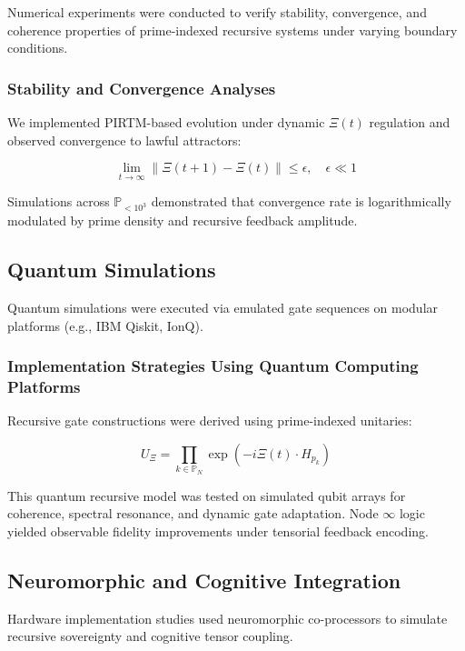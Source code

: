 \documentclass[12pt]{article}
\begin{document}
Numerical experiments were conducted to verify stability, convergence, and coherence properties of prime-indexed recursive systems under varying boundary conditions.

\subsubsection*{Stability and Convergence Analyses}

We implemented PIRTM-based evolution under dynamic $\Xi(t)$ regulation and observed convergence to lawful attractors:

\begin{equation}
\lim_{t \to \infty} \| \Xi(t+1) - \Xi(t) \| \leq \epsilon, \quad \epsilon \ll 1
\end{equation}

Simulations across $\mathbb{P}_{<10^3}$ demonstrated that convergence rate is logarithmically modulated by prime density and recursive feedback amplitude.

\subsection{Quantum Simulations}

Quantum simulations were executed via emulated gate sequences on modular platforms (e.g., IBM Qiskit, IonQ).

\subsubsection*{Implementation Strategies Using Quantum Computing Platforms}

Recursive gate constructions were derived using prime-indexed unitaries:

\begin{equation}
U_{\Xi} = \prod_{k \in \mathbb{P}_N} \exp\left( -i \Xi(t) \cdot H_{p_k} \right)
\end{equation}

This quantum recursive model was tested on simulated qubit arrays for coherence, spectral resonance, and dynamic gate adaptation. Node \( \infty \) logic yielded observable fidelity improvements under tensorial feedback encoding.

\subsection{Neuromorphic and Cognitive Integration}

Hardware implementation studies used neuromorphic co-processors to simulate recursive sovereignty and cognitive tensor coupling.
\end{document}
